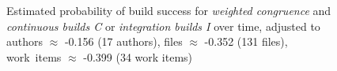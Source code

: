 \begin{figure}
{     \label{subfig:prob_weighted_age_typeci_q025}
  }
  
	\caption{Estimated probability of build success for \emph{weighted congruence} and \emph{continuous builds C} or \emph{integration builds I}  over time, adjusted to authors $\approx$ -0.156 (17 authors), files $\approx$ -0.352 (131 files), work~items $\approx$ -0.399 (34 work items)}
	\label{fig:weighted_congruence_typeci_age}
\end{figure}

